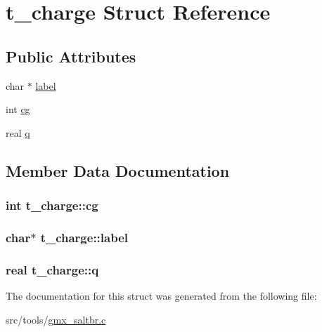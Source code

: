 \hypertarget{structt__charge}{\section{t\-\_\-charge \-Struct \-Reference}
\label{structt__charge}
}
\subsection*{\-Public \-Attributes}
\begin{DoxyCompactItemize}
\item 
char $\ast$ \hyperlink{structt__charge_a727e49be9aacfa979ca7af6729825428}{label}
\item 
int \hyperlink{structt__charge_a44fb165881626e09c3983fcfe5389b94}{cg}
\item 
real \hyperlink{structt__charge_abb5dbebc8b36ac82775de60d99e9f4bb}{q}
\end{DoxyCompactItemize}


\subsection{\-Member \-Data \-Documentation}
\hypertarget{structt__charge_a44fb165881626e09c3983fcfe5389b94}{
\subsubsection[{cg}]{\setlength{\rightskip}{0pt plus 5cm}int {\bf t\-\_\-charge\-::cg}}}\label{structt__charge_a44fb165881626e09c3983fcfe5389b94}
\hypertarget{structt__charge_a727e49be9aacfa979ca7af6729825428}{
\subsubsection[{label}]{\setlength{\rightskip}{0pt plus 5cm}char$\ast$ {\bf t\-\_\-charge\-::label}}}\label{structt__charge_a727e49be9aacfa979ca7af6729825428}
\hypertarget{structt__charge_abb5dbebc8b36ac82775de60d99e9f4bb}{
\subsubsection[{q}]{\setlength{\rightskip}{0pt plus 5cm}real {\bf t\-\_\-charge\-::q}}}\label{structt__charge_abb5dbebc8b36ac82775de60d99e9f4bb}


\-The documentation for this struct was generated from the following file\-:\begin{DoxyCompactItemize}
\item 
src/tools/\hyperlink{gmx__saltbr_8c}{gmx\-\_\-saltbr.\-c}\end{DoxyCompactItemize}
